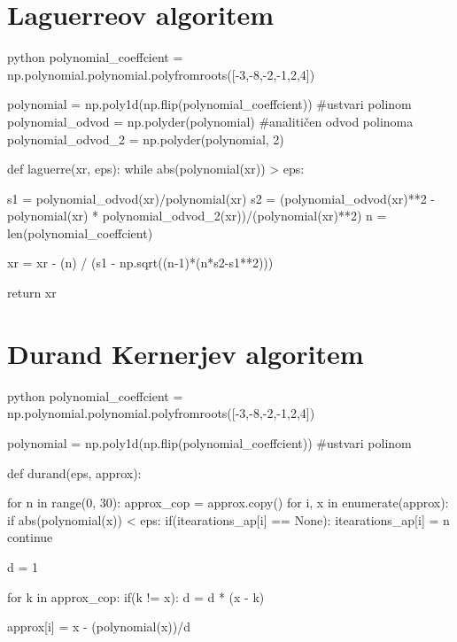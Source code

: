 \section{Laguerreov algoritem}

\begin{mintedbox}{python}
    polynomial_coeffcient = np.polynomial.polynomial.polyfromroots([-3,-8,-2,-1,2,4])


polynomial = np.poly1d(np.flip(polynomial_coeffcient)) #ustvari polinom
polynomial_odvod = np.polyder(polynomial) #analitičen odvod polinoma
polynomial_odvod_2 = np.polyder(polynomial, 2)



def laguerre(xr, eps):
    while abs(polynomial(xr)) > eps:

        s1 =  polynomial_odvod(xr)/polynomial(xr)
        s2 = (polynomial_odvod(xr)**2 - polynomial(xr) * polynomial_odvod_2(xr))/(polynomial(xr)**2)
        n = len(polynomial_coeffcient)

        xr = xr - (n) / (s1 - np.sqrt((n-1)*(n*s2-s1**2)))

    return xr
\end{mintedbox}

\section{Durand Kernerjev algoritem}

\begin{mintedbox}{python}
    polynomial_coeffcient = np.polynomial.polynomial.polyfromroots([-3,-8,-2,-1,2,4])


polynomial = np.poly1d(np.flip(polynomial_coeffcient)) #ustvari polinom


def durand(eps, approx):

    for n in range(0, 30):
        approx_cop = approx.copy()
        for i, x in enumerate(approx):
            if abs(polynomial(x)) < eps: 
                if(itearations_ap[i] == None):
                    itearations_ap[i] = n
                continue

            d = 1

            for k in approx_cop:
                if(k != x):
                    d = d * (x - k)

            approx[i] = x - (polynomial(x))/d
\end{mintedbox}